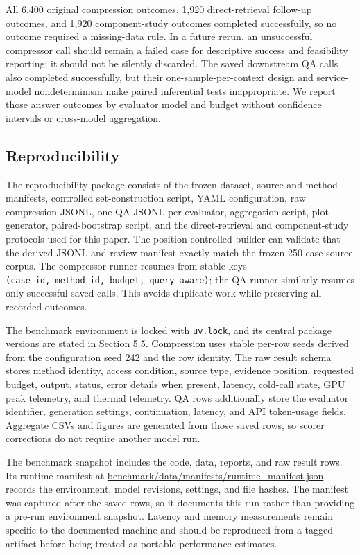 \documentclass[
]{article}
\begin{document}
All 6,400 original compression outcomes, 1,920 direct-retrieval follow-up
outcomes, and 1,920 component-study outcomes completed successfully, so no
outcome required a missing-data rule. In a future rerun, an unsuccessful compressor call
should remain a failed case for descriptive success and feasibility
reporting; it should not be silently discarded. The saved downstream QA
calls also completed successfully, but their one-sample-per-context
design and service-model nondeterminism make paired inferential tests
inappropriate. We report those answer outcomes by evaluator model and
budget without confidence intervals or cross-model aggregation.

\subsection{Reproducibility}\label{reproducibility}

The reproducibility package consists of the frozen dataset, source and
method manifests, controlled set-construction script, YAML
configuration, raw compression JSONL, one QA JSONL per evaluator,
aggregation script, plot generator, paired-bootstrap script, and the direct-retrieval
and component-study protocols used for this paper. The position-controlled builder can validate that the
derived JSONL and review manifest exactly match the frozen 250-case
source corpus. The compressor runner resumes from stable keys
\texttt{(case\_id,\ method\_id,\ budget,\ query\_aware)}; the QA runner
similarly resumes only successful saved calls. This avoids duplicate
work while preserving all recorded outcomes.

The benchmark environment is locked with \texttt{uv.lock}, and its
central package versions are stated in Section 5.5. Compression uses
stable per-row seeds derived from the configuration seed 242 and the row
identity. The raw result schema stores method identity, access
condition, source type, evidence position, requested budget, output,
status, error details when present, latency, cold-call state, GPU peak
telemetry, and thermal telemetry. QA rows additionally store the
evaluator identifier, generation settings, continuation, latency, and
API token-usage fields. Aggregate CSVs and figures are generated from
those saved rows, so scorer corrections do not require another model
run.

The benchmark snapshot includes the code, data, reports, and raw result
rows. Its runtime manifest at
\url{benchmark/data/manifests/runtime_manifest.json} records the
environment, model revisions, settings, and file hashes. The manifest was
captured after the saved rows, so it documents this run rather than
providing a pre-run environment snapshot. Latency and memory measurements
remain specific to the documented machine and should be reproduced from a
tagged artifact before being treated as portable performance estimates.
\end{document}
